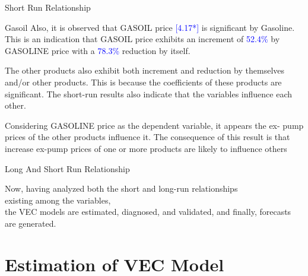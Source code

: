 \documentclass{beamer}
\newcommand{\vspaceTen}{\vspace{10pt}}
\newcommand{\colorPrimary}{blue}
\newcommand{\textPrimary}[1]{\textcolor{\colorPrimary}{#1}}
\begin{document}
	\begin{frame}{Short Run Relationship}
		
		\begin{block}{Gasoil}
			Also, it is observed that GASOIL price \textPrimary{[4.17*]} is significant by Gasoline. This is an indication that GASOIL price exhibits an increment of \textPrimary{52.4\%} by GASOLINE price with a \textPrimary{78.3\%} reduction by itself. 
		\end{block}
	
		\begin{block}{}
			The other products also exhibit both increment and reduction by themselves and/or other products. This is because the coefficients of these products are significant. The short-run results also indicate that the variables influence each other.
		\end{block}
		\begin{block}{}
			 Considering GASOLINE price as the dependent variable, it appears the ex- pump prices of the other products influence it. The consequence of this result is that increase ex-pump prices of one or more products are likely to influence others
		\end{block}
		
	\end{frame}
	
	\begin{frame}{Long And Short Run Relationship}
		\begin{block}{}
			\vspaceTen
			Now, having analyzed both the short and long-run relationships \\ existing among the variables, \\
			the VEC models are estimated, diagnosed, and validated, and
			finally, forecasts are generated.
			\vspaceTen
		\end{block}
	\end{frame}
	
	\section{Estimation of VEC Model}
	
\end{document}
